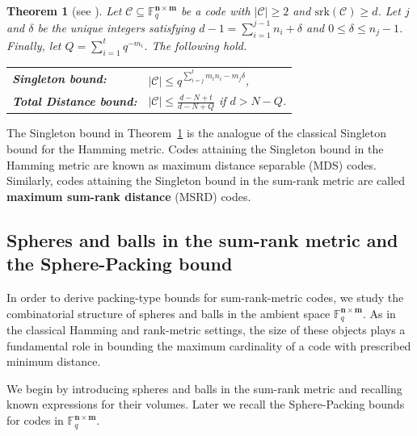 \documentclass[a4paper]{article}
\newtheorem{theorem}[formula]{Theorem}
\newcommand{\F}{\mathbb{F}}
\newcommand{\bfn}{\mathbf {n}}
\newcommand{\bfm}{\mathbf {m}}
\newcommand{\spac}{\F^{\bfn\times\bfm}_q}
\newcommand{\srk}{\mathrm{srk}}
\newcommand{\mC}{\mathcal{C}}
\begin{document}
\begin{theorem}[see ]\label{thm:non-induced-singleton-td} Let $\mC\subseteq\spac$ be a code with $|\mC|\geq2$ and $\srk(\mC)\ge d$. Let $j$ and $\delta$ be the unique integers satisfying $d-1=\sum_{i=1}^{j-1} n_i + \delta$ and $0\leq\delta\leq n_j-1$.  Finally, let $Q=\sum_{i=1}^t q^{-m_i}$.
The following hold.
{\small{
\begin{center}
    \begin{tabular}{ll}
     \textbf{Singleton bound:} & $|\mC|\leq q^{\sum_{i=j}^t m_in_i-m_j\delta}$, \\[0.5cm]
     \textbf{Total Distance bound:} & $|\mC|\leq\frac{d-N+t}{d-N+Q}$ if $d>N-Q$. \\[0.5cm]
\end{tabular}
\end{center}
}}

\end{theorem}
 

The Singleton bound in Theorem~\ref{thm:non-induced-singleton-td} is the analogue of the classical Singleton bound for the Hamming metric. Codes attaining the Singleton bound in the Hamming metric are known as maximum distance separable (MDS) codes. Similarly, codes attaining the Singleton bound in the sum-rank metric are called \textbf{maximum sum-rank distance} (MSRD) codes.


\subsection{Spheres and balls in the sum-rank metric and the Sphere-Packing bound}\label{sec:spheresandperfectcodes}
In order to derive packing-type bounds for sum-rank-metric codes, we study the combinatorial structure of spheres and balls in the ambient space $\spac$. As in the classical Hamming and rank-metric settings, the size of these objects plays a fundamental role in bounding the maximum cardinality of a code with prescribed minimum distance. 

We begin by introducing spheres and balls in the sum-rank metric and recalling known expressions for their volumes. Later we recall the Sphere-Packing bounds for codes in $\spac$. 
\end{document}
